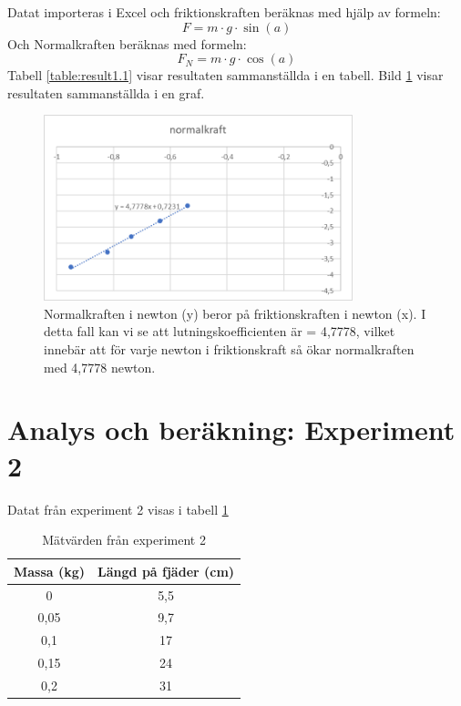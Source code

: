 \documentclass[11p, titlepage, oneside, a4paper]{article}
\begin{document}
Datat importeras i Excel och friktionskraften beräknas med hjälp av formeln:
    \begin{equation}
        F = {m}\cdot{g}\cdot{\sin(a)}
    \end{equation}
    Och Normalkraften beräknas med formeln:
    \begin{equation}
        F_N = {m}\cdot{g}\cdot{\cos(a)}
    \end{equation}
    Tabell \ref{table:result1.1} visar resultaten sammanställda i en tabell.
    Bild \ref{fig:graf1} visar resultaten sammanställda i en graf.

        \begin{figure}[!h]
            \includegraphics[width=0.8\textwidth]{images/lutandeplangraf}
            \caption{Normalkraften i newton (y) beror på friktionskraften i newton (x). I detta fall kan vi se att lutningskoefficienten är = 4,7778, vilket innebär att för varje newton i friktionskraft så ökar normalkraften med 4,7778 newton.}
            \label{fig:graf1}
        \end{figure}

        \section{Analys och beräkning: Experiment 2}
        Datat från experiment 2 visas i tabell \ref{table:result2}

\begin{table}
    \begin{center}
        \begin{tabular}{ |c|c| }
            \hline
            Massa (kg) & Längd på fjäder (cm)  \\
            \hline
            0 & 5,5 \\
            0,05 & 9,7 \\
            0,1 & 17 \\
            0,15 & 24 \\
            0,2 & 31 \\
            \hline
        \end{tabular}
        \caption{Mätvärden från experiment 2}
        \label{table:result2}
    \end{center}
\end{table}
\end{document}
